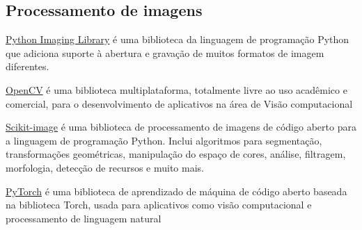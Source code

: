 \subsection*{Processamento de imagens}

\underline{Python Imaging Library}
é uma biblioteca da linguagem de programação Python que adiciona suporte à abertura e gravação de muitos formatos de imagem diferentes.

\underline{OpenCV}
é uma biblioteca multiplataforma, totalmente livre ao uso acadêmico e comercial, para o desenvolvimento de aplicativos na área de Visão computacional

\underline{Scikit-image}
é uma biblioteca de processamento de imagens de código aberto para a linguagem de programação Python. Inclui algoritmos para segmentação, transformações geométricas, manipulação do espaço de cores, análise, filtragem, morfologia, detecção de recursos e muito mais.

\underline{PyTorch}
é uma biblioteca de aprendizado de máquina de código aberto baseada na biblioteca Torch, usada para aplicativos como visão computacional e processamento de linguagem natural
